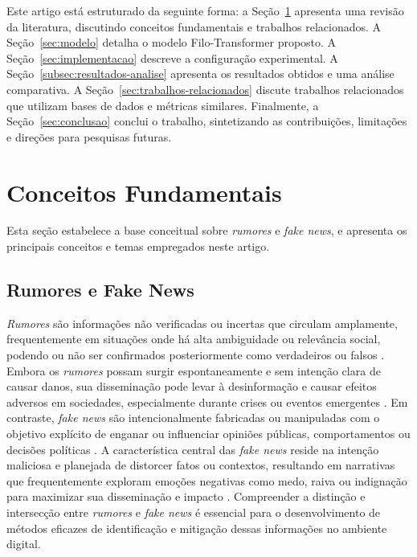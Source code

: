\documentclass[12pt]{article}
\begin{document}
Este artigo está estruturado da seguinte forma: a Seção~\ref{sec:rev-literatura} apresenta uma revisão da literatura, discutindo conceitos fundamentais e trabalhos relacionados. A Seção~\ref{sec:modelo} detalha o modelo Filo-Transformer proposto. A Seção~\ref{sec:implementacao} descreve a configuração experimental. A Seção~\ref{subsec:resultados-analise} apresenta os resultados obtidos e uma análise comparativa. A Seção~\ref{sec:trabalhos-relacionados} discute trabalhos relacionados que utilizam bases de dados e métricas similares. Finalmente, a Seção~\ref{sec:conclusao} conclui o trabalho, sintetizando as contribuições, limitações e direções para pesquisas futuras.

\section{Conceitos Fundamentais} \label{sec:rev-literatura}
Esta seção estabelece a base conceitual sobre \textit{rumores} e \textit{fake news}, e apresenta os principais conceitos e temas empregados neste artigo.

\subsection{Rumores e Fake News}
\textit{Rumores} são informações não verificadas ou incertas que circulam amplamente, frequentemente em situações onde há alta ambiguidade ou relevância social, podendo ou não ser confirmados posteriormente como verdadeiros ou falsos \cite{vosoughi2018spread}. Embora os \textit{rumores} possam surgir espontaneamente e sem intenção clara de causar danos, sua disseminação pode levar à desinformação e causar efeitos adversos em sociedades, especialmente durante crises ou eventos emergentes \cite{Zubiaga2016}. Em contraste, \textit{fake news} são intencionalmente fabricadas ou manipuladas com o objetivo explícito de enganar ou influenciar opiniões públicas, comportamentos ou decisões políticas \cite{lazer2018science,Shu2017}. A característica central das \textit{fake news} reside na intenção maliciosa e planejada de distorcer fatos ou contextos, resultando em narrativas que frequentemente exploram emoções negativas como medo, raiva ou indignação para maximizar sua disseminação e impacto \cite{Wardle2017}. Compreender a distinção e intersecção entre \textit{rumores} e \textit{fake news} é essencial para o desenvolvimento de métodos eficazes de identificação e mitigação dessas informações no ambiente digital.
\end{document}
